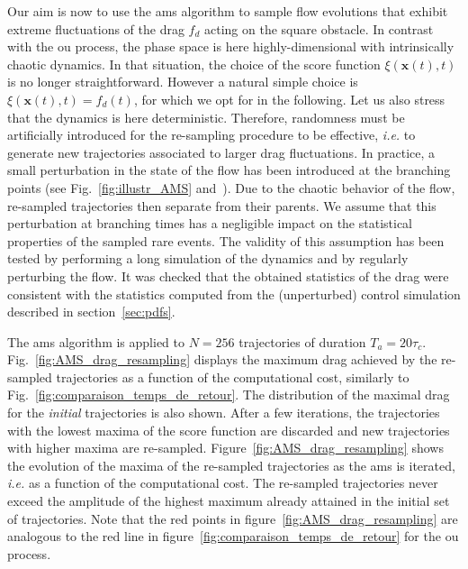 \documentclass[pre,aps,floatfix,10pt,superscriptaddress, notitlepage,preprint]{revtex4-1}
\newcommand{\EL}[1]{{\color{myred}{#1}}}
\begin{document}
%
%
Our aim is now to use the \ac{ams} algorithm to sample flow evolutions that exhibit extreme fluctuations of the drag $f_d$ acting on the square obstacle.
In contrast with the \acl{ou} process, the phase space is here highly-dimensional with intrinsically chaotic dynamics.
In that situation, the choice of the score function $\xi (\mathbf{x}(t),t)$ is no longer straightforward.
However a natural simple choice is $\xi (\mathbf{x}(t),t) = f_d(t)$, for which we opt for in the following.
%
{Let us also stress that the dynamics is here deterministic.
Therefore, randomness must be artificially introduced for the re-sampling procedure to be effective, \textit{i.e.} to generate new trajectories associated to larger drag fluctuations.
In practice, a small perturbation in the state of the flow has been introduced at the branching points (see Fig.~\ref{fig:illustr_AMS} and~\cite{wouters2016rare}).
%
Due to the chaotic behavior of the flow, re-sampled trajectories then separate from their parents.
We assume that this perturbation at branching times has a negligible impact on the statistical properties of the sampled rare events.
The validity of this assumption has been tested by performing a long simulation of the dynamics and by regularly perturbing the flow.
It was checked that the obtained statistics of the drag were consistent with the statistics computed from the (unperturbed) control simulation described in section~\ref{sec:pdfs}.}


%
The \ac{ams} algorithm is applied to $N=256$ trajectories of duration $T_a = 20\tau_c$.
%
Fig.~\ref{fig:AMS_drag_resampling} displays the maximum drag achieved by the re-sampled trajectories as a function of the computational cost, similarly to Fig.~\ref{fig:comparaison_temps_de_retour}.
%
%
The distribution of the maximal drag for the \textit{initial} trajectories is also shown.
After a few iterations, the trajectories with the lowest maxima of the score function are discarded and new trajectories with higher maxima are re-sampled.
Figure~\ref{fig:AMS_drag_resampling} shows the evolution of the maxima of the re-sampled trajectories as the \ac{ams} is iterated, \textit{i.e.} as a function of the computational cost.
The re-sampled trajectories never exceed the amplitude of the highest maximum already attained in the initial set of trajectories.
Note that the red points in figure~\ref{fig:AMS_drag_resampling} are analogous to the red line in figure~\ref{fig:comparaison_temps_de_retour} for the \ac{ou} process.
\end{document}
